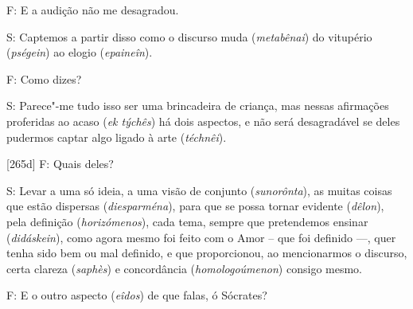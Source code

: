  

F: E a audição não me desagradou.

 

S: Captemos a partir disso como o discurso muda (\emph{metabênai}) do
vitupério (\emph{pségein}) ao elogio (\emph{epaineîn}).

 

F: Como dizes?

 

S: Parece"-me tudo isso ser uma brincadeira de criança, mas nessas
afirmações proferidas ao acaso (\emph{ek týchês}) há dois aspectos, e
não será desagradável se deles pudermos captar algo ligado à arte
(\emph{téchnêi}).

 

[265d] F: Quais deles?

 

S: Levar a uma só ideia, a uma visão de conjunto (\emph{sunorônta}), as
muitas coisas que estão dispersas (\emph{diesparména}), para que se
possa tornar evidente (\emph{dêlon}), pela definição
(\emph{horizómenos}), cada tema, sempre que pretendemos ensinar
(\emph{didáskein}), como agora mesmo foi feito com o Amor -- que foi
definido \mbox{---,} quer tenha sido bem ou mal definido, e que proporcionou, ao
mencionarmos o discurso, certa clareza (\emph{saphès}) e concordância
(\emph{homologoúmenon}) consigo mesmo.

 

F: E o outro aspecto (\emph{eîdos}) de que falas, ó Sócrates?

 
